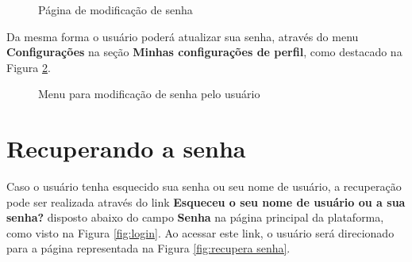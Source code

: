 \begin{figure}[htbp]
 \begin{center}
  \caption{Página de modificação de senha}
  \label{fig:modifica senha}
 \end{center}
\end{figure}

Da mesma forma o usuário poderá atualizar sua senha, através do menu \textbf{Configurações} na seção \textbf{Minhas configurações de perfil}, como destacado na Figura \ref{fig:menu senha}.

\begin{figure}[htbp]
 \begin{center}
  \caption{Menu para modificação de senha pelo usuário}
  \label{fig:menu senha}
 \end{center}
\end{figure}

\section{Recuperando a senha}
Caso o usuário tenha esquecido sua senha ou seu nome de usuário, a recuperação pode ser realizada através do link \textbf{Esqueceu o seu nome de usuário ou a sua senha? }disposto abaixo do campo \textbf{Senha} na página principal da plataforma, como visto na Figura \ref{fig:login}. Ao acessar este link, o usuário será direcionado para a página representada na Figura \ref{fig:recupera senha}.

